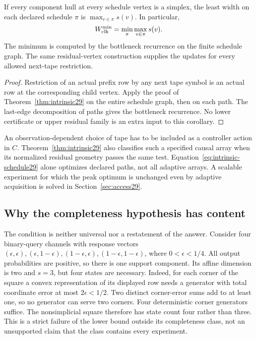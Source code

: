 \begin{corollary}
\label{cor:intrinsic-schedule29}
If every component hull at every schedule vertex is a simplex, the least
width on each declared schedule $\pi$ is
$\max_{v\in\pi}s(v)$. In particular,
\begin{equation}\label{eq:intrinsic-schedule29}
 W^{\min}_{\rm clk}
       =\min_{\pi}\max_{v\in\pi}s(v).
\end{equation}
The minimum is computed by the bottleneck recurrence on the finite
schedule graph. The same residual-vertex construction supplies the
updates for every allowed next-tape restriction.
\end{corollary}
\begin{proof}
Restriction of an actual prefix row by any next tape symbol is an actual
row at the corresponding child vertex. Apply the proof of
Theorem~\ref{thm:intrinsic29} on the entire schedule graph, then on each
path. The last-edge decomposition of paths gives the bottleneck
recurrence. No lower certificate or upper residual family is an extra
input to this corollary.
\end{proof}

An observation-dependent choice of tape has to be included as a
controller action in $C$. Theorem~\ref{thm:intrinsic29} also classifies
such a specified causal array when its normalized residual geometry
passes the same test. Equation~\eqref{eq:intrinsic-schedule29} alone
optimizes declared paths, not all adaptive arrays. A scalable experiment
for which the peak optimum is unchanged even by adaptive acquisition
is solved in Section~\ref{sec:access29}.

\subsection{Why the completeness hypothesis has content}
The condition is neither universal nor a restatement of the answer.
Consider four binary-query channels with response vectors
$(\epsilon,\epsilon),(\epsilon,1-\epsilon),
(1-\epsilon,\epsilon),(1-\epsilon,1-\epsilon)$, where
$0<\epsilon<1/4$. All output probabilities are positive, so there is one
support component. Its affine dimension is two and $s=3$, but four
states are necessary. Indeed, for each corner of the square a convex
representation of its displayed row needs a generator with total
coordinate error at most $2\epsilon<1/2$. Two distinct corner-error
sums add to at least one, so no generator can serve two corners.
Four deterministic corner generators suffice. The nonsimplicial square
therefore has state count four rather than three. This is a strict
failure of the lower bound outside its completeness class, not an
unsupported claim that the class contains every experiment.

